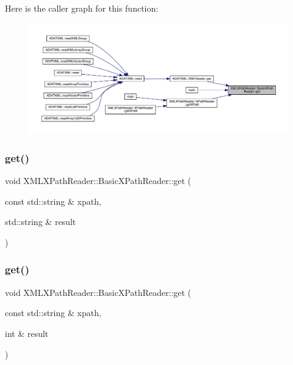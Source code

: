 Here is the caller graph for this function\+:\nopagebreak
\begin{figure}[H]
\begin{center}
\leavevmode
\includegraphics[width=350pt]{d6/dbf/classXMLXPathReader_1_1BasicXPathReader_a167f3e878414daf1c5804ee1de3235e9_icgraph}
\end{center}
\end{figure}
\mbox{\label{classXMLXPathReader_1_1BasicXPathReader_a3498d5a0bf7d47094e2d8f7d81e629af}} 
\subsubsection{\texorpdfstring{get()}{get()}\hspace{0.1cm}{\footnotesize\ttfamily [2/20]}}
{\footnotesize\ttfamily void X\+M\+L\+X\+Path\+Reader\+::\+Basic\+X\+Path\+Reader\+::get (\begin{DoxyParamCaption}\item[{const std\+::string \&}]{xpath,  }\item[{std\+::string \&}]{result }\end{DoxyParamCaption})}

\mbox{\label{classXMLXPathReader_1_1BasicXPathReader_adffe50d2d1617b1a1769e6df0e64b33f}} 
\subsubsection{\texorpdfstring{get()}{get()}\hspace{0.1cm}{\footnotesize\ttfamily [3/20]}}
{\footnotesize\ttfamily void X\+M\+L\+X\+Path\+Reader\+::\+Basic\+X\+Path\+Reader\+::get (\begin{DoxyParamCaption}\item[{const std\+::string \&}]{xpath,  }\item[{int \&}]{result }\end{DoxyParamCaption})}

